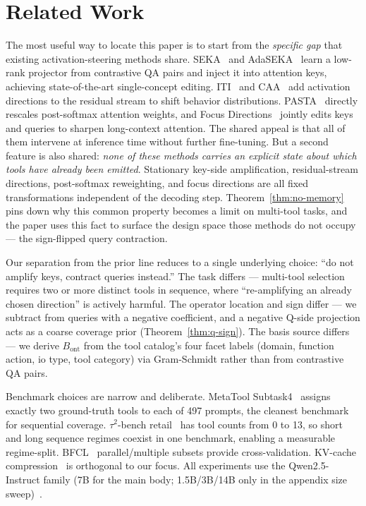 \section{Related Work}\label{sec:related}

The most useful way to locate this paper is to start from the \emph{specific gap} that existing activation-steering methods share. SEKA~\citep{SEKA} and AdaSEKA~\citep{AdaSEKA} learn a low-rank projector from contrastive QA pairs and inject it into attention keys, achieving state-of-the-art single-concept editing. ITI~\citep{ITI} and CAA~\citep{CAA} add activation directions to the residual stream to shift behavior distributions. PASTA~\citep{PASTA} directly rescales post-softmax attention weights, and Focus Directions~\citep{FocusDirections} jointly edits keys and queries to sharpen long-context attention. The shared appeal is that all of them intervene at inference time without further fine-tuning. But a second feature is also shared: \emph{none of these methods carries an explicit state about which tools have already been emitted}. Stationary key-side amplification, residual-stream directions, post-softmax reweighting, and focus directions are all fixed transformations independent of the decoding step. Theorem~\ref{thm:no-memory} pins down why this common property becomes a limit on multi-tool tasks, and the paper uses this fact to surface the design space those methods do not occupy --- the sign-flipped query contraction.

Our separation from the prior line reduces to a single underlying choice: ``do not amplify keys, contract queries instead.'' The task differs --- multi-tool selection requires two or more distinct tools in sequence, where ``re-amplifying an already chosen direction'' is actively harmful. The operator location and sign differ --- we subtract from queries with a negative coefficient, and a negative Q-side projection acts as a coarse coverage prior (Theorem~\ref{thm:q-sign}). The basis source differs --- we derive $B_{\mathrm{ont}}$ from the tool catalog's four facet labels (domain, function action, io type, tool category) via Gram-Schmidt rather than from contrastive QA pairs.

Benchmark choices are narrow and deliberate. MetaTool Subtask4~\citep{MetaTool} assigns exactly two ground-truth tools to each of 497 prompts, the cleanest benchmark for sequential coverage. $\tau^2$-bench retail~\citep{tau2bench} has tool counts from 0 to 13, so short and long sequence regimes coexist in one benchmark, enabling a measurable regime-split. BFCL~\citep{BFCL} parallel/multiple subsets provide cross-validation. KV-cache compression~\citep{KIVI} is orthogonal to our focus. All experiments use the Qwen2.5-Instruct family (7B for the main body; 1.5B/3B/14B only in the appendix size sweep)~\citep{qwen25}.
